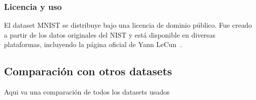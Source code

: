 \subsubsection{Licencia y uso}
El dataset MNIST se distribuye bajo una licencia de dominio público.
Fue creado a partir de los datos originales del NIST y está disponible en diversas plataformas, incluyendo la página
oficial de Yann LeCun~\cite{lecun_yann_nodate}.


\subsection{Comparación con otros datasets}\label{subsec:comparacion-con-otros-datasets}
Aqui va una comparación de todos los datasets usados
